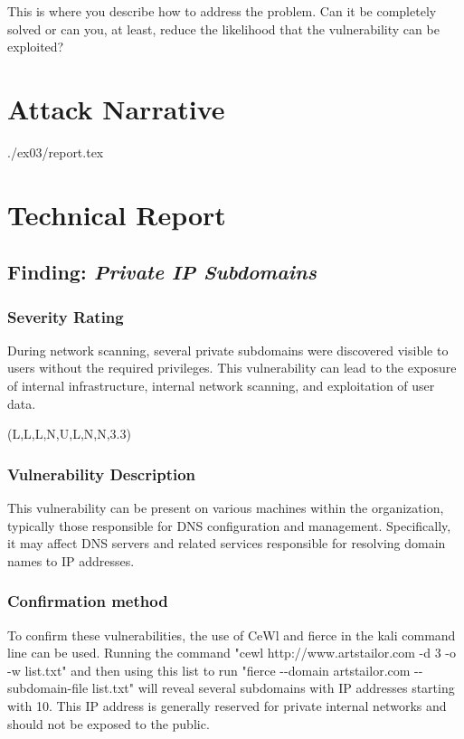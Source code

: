     	This is where you describe how to address the problem.
    	Can it be completely solved or can you, at least, reduce the
    	likelihood that the vulnerability can be exploited?
		



\section{Attack Narrative}
./ex03/report.tex

\section{Technical Report}

  \subsection{Finding: \emph{Private IP Subdomains}}
  
	\subsubsection*{Severity Rating}
	    During network scanning, several private subdomains were discovered visible to users without
            the required privileges. This vulnerability can lead to the exposure of internal infrastructure, internal network scanning, and exploitation of user data.
            
		\cvss(L,L,L,N,U,L,N,N,3.3)
		
  	\subsubsection*{Vulnerability Description}
            This vulnerability can be present on various machines within the organization, typically those responsible for DNS configuration and management. Specifically, it may affect DNS servers and related services responsible for resolving domain names to IP addresses.
  		
  	\subsubsection*{Confirmation method}
            To confirm these vulnerabilities, the use of CeWl and fierce in the kali command line can be used. Running the command "cewl http://www.artstailor.com -d 3 -o -w list.txt" and then using this list to run "fierce -{}-domain artstailor.com -{}-subdomain-file list.txt" will reveal several subdomains with IP addresses starting with 10. This IP address is generally reserved for private internal networks and should not be exposed to the  public.
		
